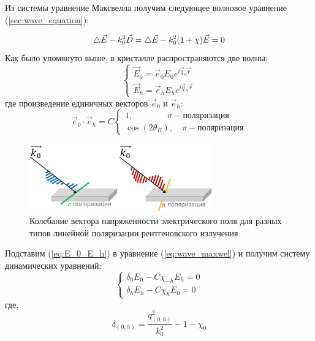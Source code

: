 
 Из системы уравнение Максвелла получим следующее волновое уравнение (\ref{sec:wave_equation}):

\begin{equation}
 \mathop{}\!\mathbin\bigtriangleup \vec{E} - k_0^2 \vec{D} = \mathop{}\!\mathbin\bigtriangleup \vec{E} - k_0^2 (1+\chi)\vec{E} = 0
 \label{eq:wave_maxwel}
\end{equation}
\noindent
Как было упомянуто выше, в кристалле распространяются две волны:
\begin{equation}
 \begin{cases}
   \vec{E}_0 = \vec{e}_0 E_0 e^{i\vec{q}_0\vec{r}}
   \\
   \vec{E}_h = \vec{e}_h E_h e^{i\vec{q}_h\vec{r}}
 \end{cases}
 \label{eq:E_0_E_h}
\end{equation}
\noindent
где произведение единичных векторов $\vec{e}_0$ и $\vec{e}_h$:
\begin{equation}
\vec{e}_0 \cdot \vec{e}_h = C
 \begin{cases}
   1, \quad \quad \quad \quad  \sigma    - \text{поляризация}\\
   \cos(2\theta_B), \quad   \pi - \text{поляризация}
 \end{cases}
\end{equation}

\begin{figure}[H]
  \centering
  \includegraphics[width=0.7\textwidth]{images/polarize_E.png}
  \caption{ Колебание вектора напряженности электрического поля для разных типов линейной поляризации рентгеновского излучения}
  \label{ris:polarize_E}
\end{figure}

Подставим (\ref{eq:E_0_E_h}) в уравнение (\ref{eq:wave_maxwel}) и получим
систему динамических уравнений:
\begin{equation}
 \begin{cases}
   \delta_0 E_0 - C\chi_{-h}E_h=0
   \\
   \delta_h E_h - C\chi_{h}E_0=0
 \end{cases}
\end{equation}
\noindent
где,
\begin{equation}
   \delta_{(0,h)} = \frac{q_{(0,h)}^2}{k_0^2}-1-\chi_0
\end{equation}

